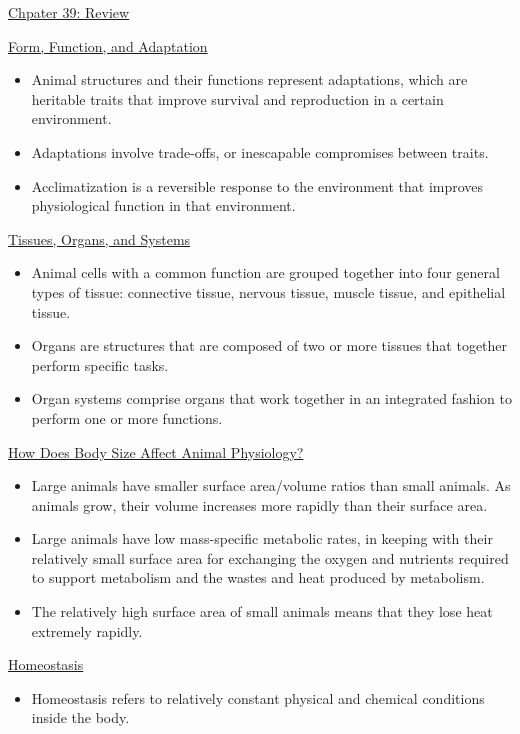 \documentclass[12pt,letterpaper]{article}
\begin{document}
\hypertarget{39.r}{}
\begin{probbox}{\hyperlink{39}{Chpater 39: Review}}{
    \hyperlink{39.1}{Form, Function, and Adaptation}
    \begin{itemize}
            \item Animal structures and their functions represent adaptations, which are heritable traits that improve survival and reproduction in a certain environment.
            \item Adaptations involve trade-offs, or inescapable compromises between traits.
            \item Acclimatization is a reversible response to the environment that improves physiological function in that environment.
        \end{itemize}
    \hyperlink{39.2}{Tissues, Organs, and Systems}
    \begin{itemize}
            \item Animal cells with a common function are grouped together into
            four general types of tissue: connective tissue, nervous tissue, muscle tissue, and epithelial tissue.
            \item Organs are structures that are composed of two or more tissues that together perform specific tasks.
            \item Organ systems comprise organs that work together in an integrated fashion to perform one or more functions.
    \end{itemize}
    \hyperlink{39.3}{How Does Body Size Affect Animal Physiology?}
    \begin{itemize}
            \item Large animals have smaller surface area/volume ratios than small animals. As animals grow, their volume increases more rapidly than their surface area. 
            \item Large animals have low mass-specific metabolic rates, in keeping with their relatively small surface area for exchanging the oxygen and nutrients required to support metabolism and the wastes and heat produced by metabolism.
            \item The relatively high surface area of small animals means that they lose heat extremely rapidly.
    \end{itemize}
    \hyperlink{39.4}{Homeostasis}
    \begin{itemize}
            \item Homeostasis refers to relatively constant physical and chemical conditions inside the body. 

\end{itemize}}
\end{probbox}
\end{document}
